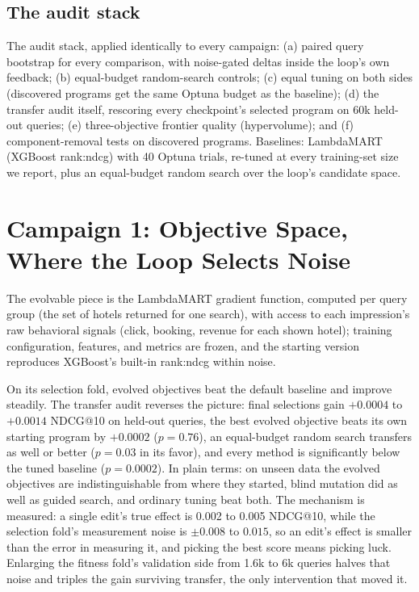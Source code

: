 \documentclass[]{ceurart}
\begin{document}
\subsection{The audit stack}
The audit stack, applied identically to every campaign: (a) paired query
bootstrap for every comparison, with noise-gated deltas inside the loop's
own feedback; (b) equal-budget random-search controls; (c) equal tuning on both sides (discovered programs get the same Optuna
budget as the baseline); (d) the transfer audit itself, rescoring every
checkpoint's selected program on 60k held-out queries; (e) three-objective
frontier quality (hypervolume); and (f) component-removal tests on
discovered programs. Baselines: LambdaMART (XGBoost rank:ndcg) with 40 Optuna trials, re-tuned
at every training-set size we report, plus an equal-budget random search
over the loop's candidate space.

\section{Campaign 1: Objective Space, Where the Loop Selects Noise}
The evolvable piece is the LambdaMART gradient function, computed per
query group (the set of hotels returned for one search), with access to each impression's raw behavioral signals (click, booking,
revenue for each shown hotel); training configuration, features, and
metrics are frozen, and the starting version reproduces XGBoost's built-in
rank:ndcg within noise.

On its selection fold, evolved objectives beat the default baseline and
improve steadily. The transfer audit reverses the picture: final selections gain $+0.0004$
to $+0.0014$ NDCG@10 on held-out queries, the best evolved objective beats
its own starting program by $+0.0002$ ($p=0.76$), an equal-budget random
search transfers as well or better ($p=0.03$ in its favor), and every method
is significantly below the tuned baseline ($p=0.0002$). In plain terms: on
unseen data the evolved objectives are indistinguishable from where they
started, blind mutation did as well as guided search, and ordinary tuning
beat both. The mechanism is measured: a single edit's true effect is 0.002 to 0.005
NDCG@10, while the selection fold's measurement noise is $\pm 0.008$ to
$0.015$, so an edit's effect is smaller than the error in measuring it, and
picking the best score means picking luck. Enlarging the fitness fold's validation side from 1.6k to 6k queries
halves that noise and triples the gain surviving transfer, the only
intervention that moved it.
\end{document}
